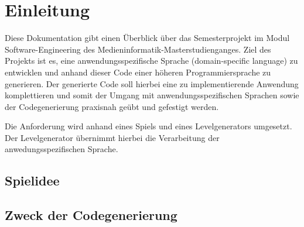 \section{Einleitung}

Diese Dokumentation gibt einen Überblick über das Semesterprojekt im Modul Software-Engineering des Medieninformatik-Masterstudienganges.
Ziel des Projekts ist es, eine anwendungsspezifische Sprache (domain-specific language) zu entwicklen und anhand dieser Code einer höheren Programmiersprache zu generieren.
Der generierte Code soll hierbei eine zu implementierende Anwendung komplettieren und somit der Umgang mit anwendungsspezifischen Sprachen sowie der Codegenerierung praxisnah geübt und gefestigt werden.

Die Anforderung wird anhand eines Spiels und eines Levelgenerators umgesetzt.
Der Levelgenerator übernimmt hierbei die Verarbeitung der anwedungsspezifischen Sprache.

\subsection{Spielidee}


\subsection{Zweck der Codegenerierung}
